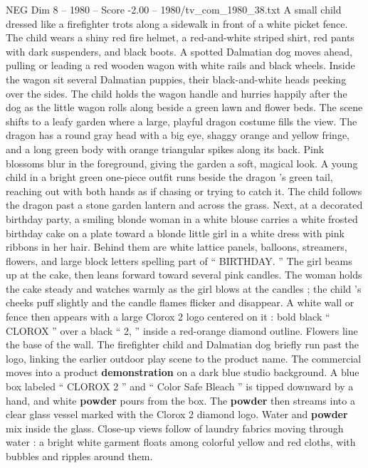 \begin{textsample}{NEG Dim 8 – 1980 – Score -2.00 – 1980/tv\_com\_1980\_38.txt}  \label{ex:f8_neg_055}
A small child dressed like a firefighter trots along a sidewalk in front of a white picket fence.
The child wears a shiny red fire helmet, a red-and-white striped shirt, red pants with dark suspenders, and black boots.
A spotted Dalmatian dog moves ahead, pulling or leading a red wooden wagon with white rails and black wheels.
Inside the wagon sit several Dalmatian puppies, their black-and-white heads peeking over the sides.
The child holds the wagon handle and hurries happily after the dog as the little wagon rolls along beside a green lawn and flower beds.
The scene shifts to a leafy garden where a large, playful dragon costume fills the view.
The dragon has a round gray head with a big eye, shaggy orange and yellow fringe, and a long green body with orange triangular spikes along its back.
Pink blossoms blur in the foreground, giving the garden a soft, magical look.
A young child in a bright green one-piece outfit runs beside the dragon ’s green tail, reaching out with both hands as if chasing or trying to catch it.
The child follows the dragon past a stone garden lantern and across the grass.
Next, at a decorated birthday party, a smiling blonde woman in a white blouse carries a white frosted birthday cake on a plate toward a blonde little girl in a white dress with pink ribbons in her hair.
Behind them are white lattice panels, balloons, streamers, flowers, and large block letters spelling part of “ BIRTHDAY. ” The girl beams up at the cake, then leans forward toward several pink candles.
The woman holds the cake steady and watches warmly as the girl blows at the candles ; the child ’s cheeks puff slightly and the candle flames flicker and disappear.
A white wall or fence then appears with a large Clorox 2 logo centered on it : bold black “ CLOROX ” over a black “ 2, ” inside a red-orange diamond outline.
Flowers line the base of the wall.
The firefighter child and Dalmatian dog briefly run past the logo, linking the earlier outdoor play scene to the product name.
The commercial moves into a product \textbf{demonstration} on a dark blue studio background.
A blue box labeled “ CLOROX 2 ” and “ Color Safe Bleach ” is tipped downward by a hand, and white \textbf{powder} pours from the box.
The \textbf{powder} then streams into a clear glass vessel marked with the Clorox 2 diamond logo.
Water and \textbf{powder} mix inside the glass.
Close-up views follow of laundry fabrics moving through water : a bright white garment floats among colorful yellow and red cloths, with bubbles and ripples around them.

\end{textsample}
